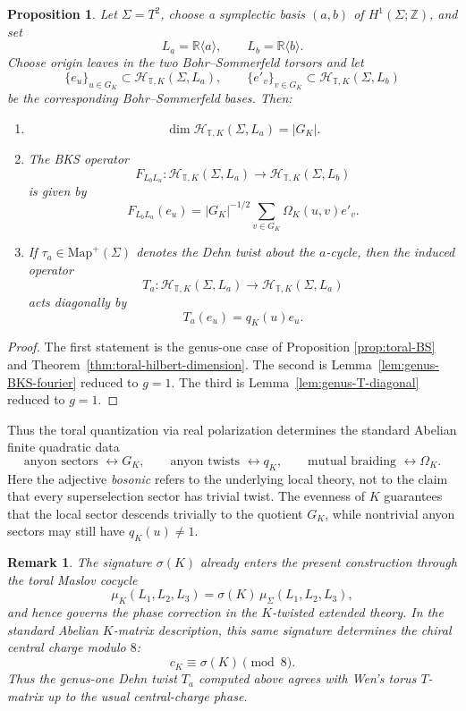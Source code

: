 \documentclass[12pt]{amsart}
\numberwithin{equation}{section}
\newtheorem{prop}[theorem]{Proposition}
\newtheorem*{remark}{Remark}
\begin{document}
\begin{prop}
Let \(\Sigma=T^2\), choose a symplectic basis \((a,b)\) of \(H^1(\Sigma;\mathbb Z)\), and set
\[
L_a=\mathbb R\langle a\rangle,
\qquad
L_b=\mathbb R\langle b\rangle.
\]
Choose origin leaves in the two Bohr--Sommerfeld torsors and let
\[
\{e_u\}_{u\in G_K}\subset \mathcal{H}_{\mathbb T,K}(\Sigma,L_a),
\qquad
\{e'_v\}_{v\in G_K}\subset \mathcal{H}_{\mathbb T,K}(\Sigma,L_b)
\]
be the corresponding Bohr--Sommerfeld bases. Then:
\begin{enumerate}[label=(\roman*)]
\item
\[
\dim \mathcal{H}_{\mathbb T,K}(\Sigma,L_a)=|G_K|.
\]

\item The BKS operator
\[
F_{L_bL_a}:\mathcal{H}_{\mathbb T,K}(\Sigma,L_a)\to \mathcal{H}_{\mathbb T,K}(\Sigma,L_b)
\]
is given by
\[
F_{L_bL_a}(e_u)
=
|G_K|^{-1/2}\sum_{v\in G_K}\Omega_K(u,v)e'_v.
\]

\item If \(\tau_a\in \mathrm{Map}^+(\Sigma)\) denotes the Dehn twist about the \(a\)-cycle, then
the induced operator
\[
T_a:\mathcal{H}_{\mathbb T,K}(\Sigma,L_a)\to \mathcal{H}_{\mathbb T,K}(\Sigma,L_a)
\]
acts diagonally by
\[
T_a(e_u)=q_K(u)e_u.
\]
\end{enumerate}
\end{prop}

\begin{proof}
The first statement is the genus-one case of Proposition \ref{prop:toral-BS}  and Theorem~\ref{thm:toral-hilbert-dimension}.
The second is Lemma~\ref{lem:genus-BKS-fourier} reduced to \(g=1\).
The third is Lemma~\ref{lem:genus-T-diagonal} reduced to \(g=1\).
\end{proof}

Thus the toral quantization via real polarization determines the standard Abelian finite quadratic
data
\[
\text{anyon sectors } \longleftrightarrow G_K,
\qquad
\text{anyon twists } \longleftrightarrow q_K,
\qquad
\text{mutual braiding } \longleftrightarrow \Omega_K.
\]
Here the adjective \emph{bosonic} refers to the underlying local theory, not to the claim
that every superselection sector has trivial twist. The evenness of \(K\) guarantees that the
local sector descends trivially to the quotient \(G_K\), while nontrivial anyon sectors may
still have \(q_K(u)\neq 1\).

\begin{remark}
The signature \(\sigma(K)\) already enters the present construction through the toral
Maslov cocycle
\[
\mu_K(L_1,L_2,L_3)=\sigma(K)\,\mu_\Sigma(L_1,L_2,L_3),
\]
and hence governs the phase correction in the \(K\)-twisted extended theory.
In the standard Abelian \(K\)-matrix description, this same signature determines the
chiral central charge modulo \(8\):
\[
c_K\equiv \sigma(K)\pmod 8.
\]
Thus the genus-one Dehn twist \(T_a\) computed above agrees with Wen's torus
\(T\)-matrix up to the usual central-charge phase.
\end{remark}
\end{document}
